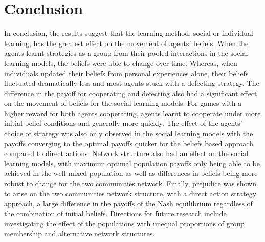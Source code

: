 \documentclass[]{llncs}
\begin{document}
\section{Conclusion}
In conclusion, the results suggest that the learning method, social or individual learning, has the greatest effect on the movement of agents’ beliefs.  When the agents learnt strategies as a group from their pooled interactions in the social learning models, the beliefs were able to change over time. Whereas, when individuals updated their beliefs from personal experiences alone, their beliefs fluctuated dramatically less and most agents stuck with a defecting strategy.  The difference in the payoff for cooperating and defecting also had a significant effect on the movement of beliefs for the social learning models. For games with a higher reward for both agents cooperating, agents learnt to cooperate under more initial belief conditions and generally more quickly. The effect of the agents’ choice of strategy was also only observed in the social learning models with the payoffs converging to the optimal payoffs quicker for the beliefs based approach compared to direct actions. Network structure also had an effect on the social learning models, with maximum optimal population payoffs only being able to be achieved in the well mixed population as well as differences in beliefs being more robust to change for the two communities network. 
Finally, prejudice was shown to arise on the two communities network structure, with a direct action strategy approach, a large difference in the payoffs of the Nash equilibrium regardless of the combination of initial beliefs. Directions for future research include investigating the effect of the populations with unequal proportions of group membership and alternative network structures. 
\end{document}
